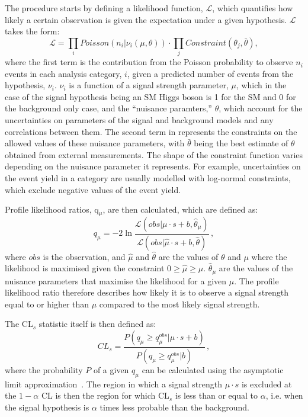 The procedure starts by defining a likelihood function, $\mathcal{L}$, which quantifies how likely a certain observation is given the expectation under a given hypothesis. $\mathcal{L}$ takes the form:
\begin{equation}
  \label{eq:likelihood}
  \mathcal{L}=\displaystyle\prod_{i}Poisson\left(n_{i}|\nu_{i}\left(\mu,\theta\right)\right)\cdot\prod_{j}Constraint\left(\theta_{j},\bar{\theta}\right),
\end{equation}
where the first term is the contribution from the Poisson probability to observe $n_{i}$ events in each analysis category, $i$, given a predicted number of events from the hypothesis, $\nu_{i}$. $\nu_{i}$ is a function of a signal strength parameter, $\mu$, which in the case of the signal hypothesis being an SM Higgs boson is 1 for the SM and 0 for the background only case, and the ``nuisance paramters,'' $\theta$, which account for the uncertainties on parameters of the signal and background models and any correlations between them. The second term in  represents the constraints on the allowed values of these nuisance parameters, with $\bar{\theta}$ being the best estimate of $\theta$ obtained from external measurements. The shape of the constraint function varies depending on the nuisance parameter it represents. For example, uncertainties on the event yield in a category are usually modelled with log-normal constraints, which exclude negative values of the event yield. 

Profile likelihood ratios, q$_{\mu}$, are then calculated, which are defined as:
\begin{equation}
  \label{eq:proflikelihood}
  q_{\mu} = -2 \ln\frac{\mathcal{L}(obs|\mu \cdot s + b,\hat{\theta}_{\mu})}{\mathcal{L}(obs|\hat{\mu} \cdot s + b,\hat{\theta})}\,,
\end{equation}
where $obs$ is the observation, and $\hat{\mu}$ and $\hat{\theta}$ are the values of $\theta$ and $\mu$ where the likelihood is maximised given the constraint $0 \geqslant \hat{\mu} \geqslant \mu$. $\hat{\theta}_{\mu}$ are the values of the nuisance parameters that maximise the likelihood for a given $\mu$. The profile likelihood ratio therefore describes how likely it is to observe a signal strength equal to or higher than $\mu$ compared to the most likely signal strength.

The CL$_{s}$ statistic itself is then defined as:
\begin{equation}
  \label{eq:cls}
  CL_{s} = \frac{P(q_{\mu}\geqslant q_{\mu}^{obs} | \mu \cdot s + b)}{P(q_{\mu}\geqslant q_{\mu}^{obs}|b)}\,,
\end{equation}
where the probability $P$ of a given $q_{\mu}$ can be calculated using the asymptotic limit approximation~\cite{Cowan:2010js}. The region in which a signal strength $\mu \cdot s$ is excluded at the $1 - \alpha$ \ac{CL} is then the region for which CL$_{s}$ is less than or equal to $\alpha$, i.e. when the signal hypothesis is $\alpha$ times less probable than the background.
